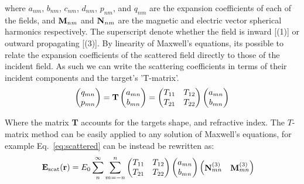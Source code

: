 where $a_{nm}$, $b_{nm}$, $c_{nm}$, $d_{nm}$, $p_{nm}$, and $q_{nm}$
are the expansion coefficients of each of the fields, and ${\bf M}_
{nm}$ and ${\bf N}_{nm}$ are the magnetic and electric vector 
spherical harmonics respectively. The superscript denote whether 
the field is inward [(1)] or outward propagating [(3)]. By linearity 
of Maxwell's equations, its possible to relate the expansion 
coefficients of the scattered field directly to those of the incident 
field. As such we can write the scattering coefficients in terms of 
their incident components and the target's 'T-matrix'.
\begin{align}
	\label{eq:t_matrix}
	\begin{pmatrix}
		q_{mn} \\
		p_{mn} 
	\end{pmatrix}
	= \bold{T} 
	\begin{pmatrix}
		a_{mn} \\
		b_{mn}
	\end{pmatrix}
	= \begin{pmatrix}
		T_{11} & T_{12} \\
		T_{21} & T_{22}
	\end{pmatrix}
	\begin{pmatrix}
		a_{mn} \\
		b_{mn}
	\end{pmatrix}
\end{align}

Where the matrix \textbf{T} accounts for the targets shape, 
and refractive index. The $T$-matrix method can be easily 
applied to any solution of Maxwell's equations, for example 
Eq.~\eqref{eq:scattered} can be instead be rewritten as:
\begin{align}
{\bf E}_{\rm scat}({\bf r})
&=
E_0 \sum_{n}^\infty \sum_{m=-n}^n 
\begin{pmatrix}
	T_{11} & T_{12} \\
	T_{21} & T_{22}
\end{pmatrix}
\begin{pmatrix}
	a_{mn} \\
	b_{mn}
\end{pmatrix}
\begin{pmatrix}
	{\bf N}_{mn}^{(3)} & {\bf M}_{mn}^{(3)}
\end{pmatrix}
\end{align}
  
